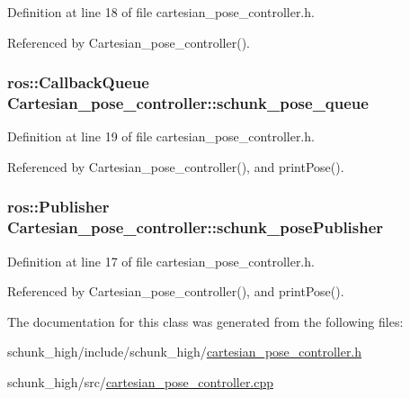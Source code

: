 Definition at line 18 of file cartesian\-\_\-pose\-\_\-controller.\-h.



Referenced by Cartesian\-\_\-pose\-\_\-controller().

\hypertarget{classCartesian__pose__controller_a5efe52a57e5239b3fd86ff456e94691b}{
\subsubsection[{schunk\-\_\-pose\-\_\-queue}]{\setlength{\rightskip}{0pt plus 5cm}ros\-::\-Callback\-Queue Cartesian\-\_\-pose\-\_\-controller\-::schunk\-\_\-pose\-\_\-queue\hspace{0.3cm}{\ttfamily [private]}}}\label{classCartesian__pose__controller_a5efe52a57e5239b3fd86ff456e94691b}


Definition at line 19 of file cartesian\-\_\-pose\-\_\-controller.\-h.



Referenced by Cartesian\-\_\-pose\-\_\-controller(), and print\-Pose().

\hypertarget{classCartesian__pose__controller_a9eb38e771e5006950b9a8075a0ea7e49}{
\subsubsection[{schunk\-\_\-pose\-Publisher}]{\setlength{\rightskip}{0pt plus 5cm}ros\-::\-Publisher Cartesian\-\_\-pose\-\_\-controller\-::schunk\-\_\-pose\-Publisher\hspace{0.3cm}{\ttfamily [private]}}}\label{classCartesian__pose__controller_a9eb38e771e5006950b9a8075a0ea7e49}


Definition at line 17 of file cartesian\-\_\-pose\-\_\-controller.\-h.



Referenced by Cartesian\-\_\-pose\-\_\-controller(), and print\-Pose().



The documentation for this class was generated from the following files\-:\begin{DoxyCompactItemize}
\item 
schunk\-\_\-high/include/schunk\-\_\-high/\hyperlink{cartesian__pose__controller_8h}{cartesian\-\_\-pose\-\_\-controller.\-h}\item 
schunk\-\_\-high/src/\hyperlink{cartesian__pose__controller_8cpp}{cartesian\-\_\-pose\-\_\-controller.\-cpp}\end{DoxyCompactItemize}
